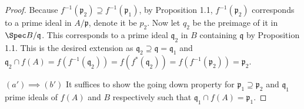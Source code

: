 \begin{proof}
	Because $f^{-1}(\mathfrak{p}_2) \supseteq f^{-1}(\mathfrak{p}_1)$, by Proposition 1.1, $f^{-1}(\mathfrak{p}_2)$ corresponds to a prime ideal in $A / \mathfrak{p} $, denote it be $p_{2} $.
	Now let $q_{2} $ be the preimage of it in $\Spec B / \mathfrak{q} $.
	This corresponds to a prime ideal $\mathfrak{q}_2 $ in $B $ containing $\mathfrak{q} $ by Proposition 1.1.
	This is the desired extension as $\mathfrak{q}_2 \supseteq \mathfrak{q} = \mathfrak{q}_1 $ and $\mathfrak{q}_2 \cap f(A) = f(f^{-1}(\mathfrak{q}_2)) = f(f^\ast(\mathfrak{q}_2)) = f(f^{-1}(\mathfrak{p}_2)) = \mathfrak{p}_2$.

	$(a') \implies (b') $ It suffices to show the going down property for $\mathfrak{p}_1 \supseteq \mathfrak{p}_2 $ and $\mathfrak{q}_1 $ prime ideals of $f(A) $ and $B $ respectively such that $\mathfrak{q}_1 \cap f(A) = \mathfrak{p}_1 $.
\end{proof}
